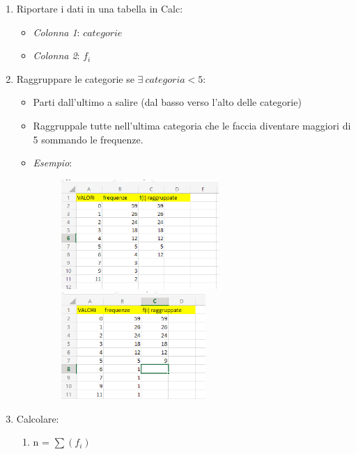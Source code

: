 \begin{enumerate}
      \item Riportare i dati in una tabella in Calc:
            \begin{itemize}
                  \item \textit{Colonna 1}: $categorie$
                  \item \textit{Colonna 2}: $f_i$
            \end{itemize}
      \item Raggruppare le categorie se $\exists \ categoria < 5$:
            \begin{itemize}
                  \item Parti dall'ultimo a salire (dal basso verso l'alto delle
                        categorie)
                  \item Raggruppale tutte nell'ultima categoria che le faccia
                        diventare maggiori di 5 sommando le frequenze.
                  \item \textit{Esempio}:
                        \begin{figure}[H]
                              \centering
                              \includegraphics[width=6cm, keepaspectratio]{capitoli/goodnes_of_fit/imgs/vesceragay.png}
                              \includegraphics[width=5.5cm, keepaspectratio]{capitoli/goodnes_of_fit/imgs/POSTAMOLTOGAY.png}
                        \end{figure}
            \end{itemize}
      \item Calcolare:
            \begin{enumerate}
                  \item n = $\sum(f_i)$

\end{enumerate}
\end{enumerate}
